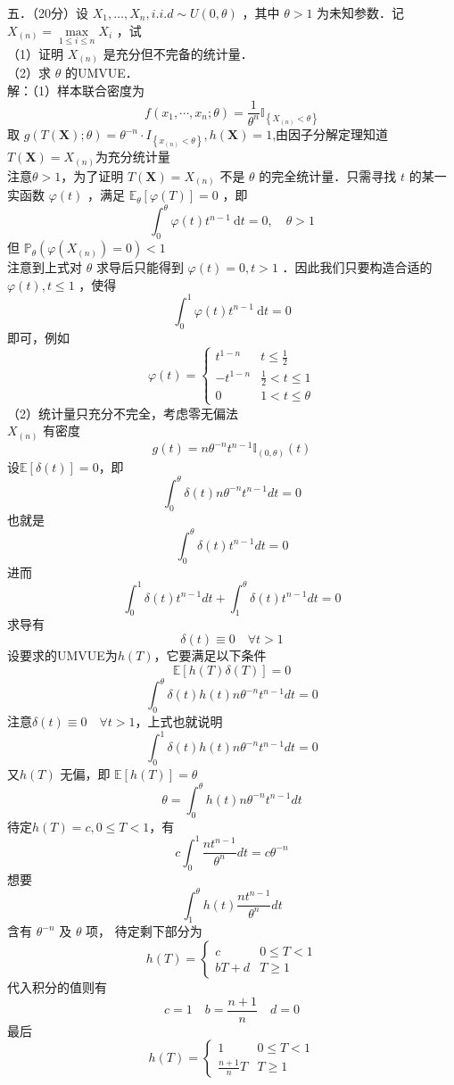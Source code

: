\documentclass[UTF8,openany]{book}
\begin{document}
	
	
	\noindent 五．（20分）设 $X_1, \ldots, X_n, i . i . d \sim U(0, \theta)$ ，其中 $\theta>1$ 为未知参数．记 $X_{(n)}=\max\limits_{1 \leq i \leq n} X_i$ ，试\\
	（1）证明 $X_{(n)}$ 是充分但不完备的统计量．\\
	（2）求 $\theta$ 的UMVUE．\\
	解：（1）样本联合密度为
	\[
	f\left(x_1, \cdots, x_n ; \theta\right)=\frac{1}{\theta^n} \mathbb{I}_{\left\{X_{(n)} < \theta\right\}}
	\]
	取 $ g(T(\boldsymbol{X}) ; \theta)=\theta^{-n} \cdot I_{\left\{x_{(n)}<\theta\right\}}, h(\boldsymbol{X})=1$,由因子分解定理知道$T(\boldsymbol{X})=X_{(n)}$为充分统计量\\
	注意$\theta>1$，为了证明 $T(\boldsymbol{X})=X_{(n)}$ 不是 $\theta$ 的完全统计量．只需寻找 $t$ 的某一实函数 $\varphi(t)$ ，满足 $\mathbb{E}_\theta[\varphi(T)]=0$ ，即
	$$
	\int_0^\theta \varphi(t) t^{n-1} \mathrm{~d} t=0, \quad \theta>1
	$$
	但 $\mathbb{P}_\theta\left(\varphi\left(X_{(n)}\right)=0\right)<1$ \\
	注意到上式对 $\theta$ 求导后只能得到 $\varphi(t)=0, t>1$ ．因此我们只要构造合适的 $\varphi(t), t \leq 1$ ，使得
	$$
	\int_0^1 \varphi(t) t^{n-1} \mathrm{~d} t=0
	$$
	即可，例如 
	\[
	\varphi(t)=
	\begin{cases}
		t^{1-n}  &  t \leq \frac{1}{2} \\
		-t^{1-n}  &  \frac{1}{2}<t\le 1\\
		0 & 1<t\le \theta
	\end{cases}
	\]
	（2）统计量只充分不完全，考虑零无偏法\\
	$X_{(n)}$ 有密度  
	\[
	g(t)=n \theta^{-n} t^{n-1} \mathbb{I}_{(0, \theta)}(t) 
	\]
	设$\mathbb{E}[\delta(t)]=0$，即
	\[
	\int_0^\theta \delta(t) n \theta^{-n} t^{n-1} d t=0 
	\]
	也就是
	\[
	\int_0^\theta \delta(t)  t^{n-1} d t=0 
	\]
	进而
	\[
	\int_0^1 \delta(t) t^{n-1} d t+\int_1^\theta \delta(t) t^{n-1} d t=0
	\]
	求导有
	\[
	\delta(t) \equiv 0 \quad \forall t>1
	\]
	设要求的UMVUE为$h(T)$，它要满足以下条件
	\[
	\mathbb{E}[h(T) \delta(T)]=0
	\]
	\[
	\int_0^\theta \delta(t) h(t) n\theta^{-n} t^{n-1} d t=0
	\]
	注意$\delta(t) \equiv 0 \quad \forall t>1$，上式也就说明
	\[
	\int_0^1 \delta(t) h(t) n\theta^{-n} t^{n-1} d t=0
	\]
	又$ h(T)$ 无偏，即  $\mathbb{E}[h(T)]=\theta$ 
	\[
	\theta=\int_{0}^{\theta} h(t) n \theta^{-n} t^{n-1} d t
	\]
	待定$h(T)=c,0\le T<1$，有
	\[
	c \int_0^1 \frac{n t^{n-1}}{\theta^n} d t=c \theta^{-n}
	\]
	想要$$\int_1^\theta h(t) \frac{n t^{n-1}}{\theta^n} d t $$ 含有 $ \theta^{-n} $ 及 $ \theta $ 项， 
	待定剩下部分为
	\[
	h(T)=
	\begin{cases}
		c  &  0\le T<1 \\
		bT+d  &  T\ge 1
	\end{cases}
	\]
	代入积分的值则有
	\[
	c=1\quad b=
	\frac{n+1}{n} \quad d=0
	\]
	最后
	\[
	h(T)=
	\begin{cases}
		1  &  0\le T<1 \\
		\frac{n+1}{n}T  &  T\ge 1
	\end{cases}
	\]
	\newpage
\end{document}
